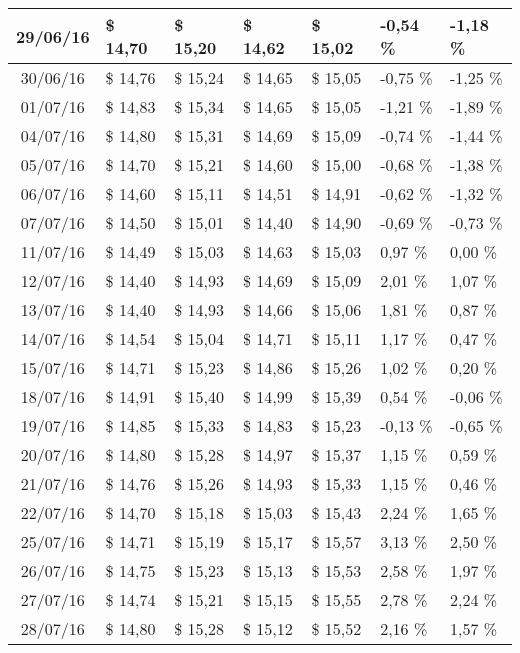 \begin{center}
\begin{longtable}{|c|p{1.5cm}|p{1.5cm}|p{1.5cm}|p{1.5cm}|p{1.5cm}|p{1.5cm}|}
29/06/16 & \$ 14,70 & \$ 15,20 & \$ 14,62 & \$ 15,02 & -0,54 \% & -1,18 \% \\ \hline
30/06/16 & \$ 14,76 & \$ 15,24 & \$ 14,65 & \$ 15,05 & -0,75 \% & -1,25 \% \\ \hline
01/07/16 & \$ 14,83 & \$ 15,34 & \$ 14,65 & \$ 15,05 & -1,21 \% & -1,89 \% \\ \hline
04/07/16 & \$ 14,80 & \$ 15,31 & \$ 14,69 & \$ 15,09 & -0,74 \% & -1,44 \% \\ \hline
05/07/16 & \$ 14,70 & \$ 15,21 & \$ 14,60 & \$ 15,00 & -0,68 \% & -1,38 \% \\ \hline
06/07/16 & \$ 14,60 & \$ 15,11 & \$ 14,51 & \$ 14,91 & -0,62 \% & -1,32 \% \\ \hline
07/07/16 & \$ 14,50 & \$ 15,01 & \$ 14,40 & \$ 14,90 & -0,69 \% & -0,73 \% \\ \hline
11/07/16 & \$ 14,49 & \$ 15,03 & \$ 14,63 & \$ 15,03 & 0,97 \% & 0,00 \% \\ \hline
12/07/16 & \$ 14,40 & \$ 14,93 & \$ 14,69 & \$ 15,09 & 2,01 \% & 1,07 \% \\ \hline
13/07/16 & \$ 14,40 & \$ 14,93 & \$ 14,66 & \$ 15,06 & 1,81 \% & 0,87 \% \\ \hline
14/07/16 & \$ 14,54 & \$ 15,04 & \$ 14,71 & \$ 15,11 & 1,17 \% & 0,47 \% \\ \hline
15/07/16 & \$ 14,71 & \$ 15,23 & \$ 14,86 & \$ 15,26 & 1,02 \% & 0,20 \% \\ \hline
18/07/16 & \$ 14,91 & \$ 15,40 & \$ 14,99 & \$ 15,39 & 0,54 \% & -0,06 \% \\ \hline
19/07/16 & \$ 14,85 & \$ 15,33 & \$ 14,83 & \$ 15,23 & -0,13 \% & -0,65 \% \\ \hline
20/07/16 & \$ 14,80 & \$ 15,28 & \$ 14,97 & \$ 15,37 & 1,15 \% & 0,59 \% \\ \hline
21/07/16 & \$ 14,76 & \$ 15,26 & \$ 14,93 & \$ 15,33 & 1,15 \% & 0,46 \% \\ \hline
22/07/16 & \$ 14,70 & \$ 15,18 & \$ 15,03 & \$ 15,43 & 2,24 \% & 1,65 \% \\ \hline
25/07/16 & \$ 14,71 & \$ 15,19 & \$ 15,17 & \$ 15,57 & 3,13 \% & 2,50 \% \\ \hline
26/07/16 & \$ 14,75 & \$ 15,23 & \$ 15,13 & \$ 15,53 & 2,58 \% & 1,97 \% \\ \hline
27/07/16 & \$ 14,74 & \$ 15,21 & \$ 15,15 & \$ 15,55 & 2,78 \% & 2,24 \% \\ \hline
28/07/16 & \$ 14,80 & \$ 15,28 & \$ 15,12 & \$ 15,52 & 2,16 \% & 1,57 \% \\ \hline

\end{longtable}
\end{center}
